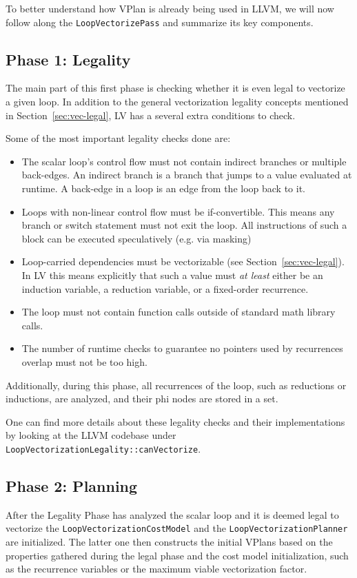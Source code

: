 \documentclass[sigplan,11pt,nonacm]{acmart}
\begin{document}
To better understand how VPlan is already being used in LLVM, we will now follow along the 
\texttt{LoopVectorizePass} and summarize its key components.

\subsection{Phase 1: Legality}
The main part of this first phase is checking whether it is even legal to vectorize a given loop. 
In addition to the general vectorization legality concepts mentioned in 
Section~\ref{sec:vec-legal}, LV has a several extra conditions to check.

Some of the most important legality checks done are:
\begin{itemize}
  \item The scalar loop's control flow must not contain indirect branches or multiple back-edges.
  An indirect branch is a branch that jumps to a value evaluated at runtime. A back-edge in a loop 
  is an edge from the loop back to it. 
  \item Loops with non-linear control flow must be if-convertible. This means any branch or switch 
  statement must not exit the loop. All instructions of such a block can be executed speculatively 
  (e.g. via masking)
  \item Loop-carried dependencies must be vectorizable (see Section~\ref{sec:vec-legal}). In LV 
  this means explicitly that such a value must \textit{at least} either be an induction variable, a reduction 
  variable, or a fixed-order recurrence.
  \item The loop must not contain function calls outside of standard math library calls.
  \item The number of runtime checks to guarantee no pointers used by recurrences overlap must not be too high.
\end{itemize}

Additionally, during this phase, all recurrences of the loop, such as reductions or inductions, are analyzed,
and their phi nodes are stored in a set.

One can find more details about these legality checks and their implementations by looking 
at the LLVM codebase under \texttt{LoopVectorizationLegality::\allowbreak canVectorize}.

\subsection{Phase 2: Planning}
After the Legality Phase has analyzed the scalar loop and it is deemed legal to vectorize the 
\texttt{LoopVectorizationCostModel} and the \texttt{LoopVectorizationPlanner} are initialized.
The latter one then constructs the initial VPlans based on the properties gathered during the legal phase
and the cost model initialization, such as the recurrence variables or the maximum viable vectorization 
factor.
\end{document}
